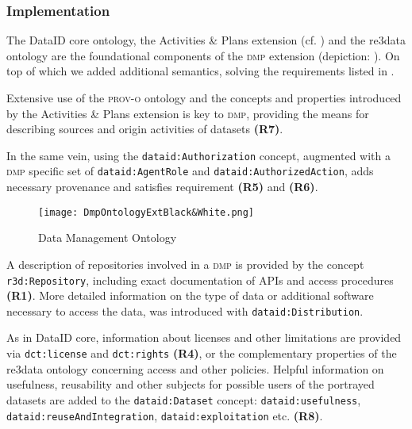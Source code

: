 \documentclass[runningheads,a4paper]{llncs}
\newcommand{\prov}{{\scshape prov-o}\xspace}
\newcommand{\dmp}{{\scshape dmp}\xspace}
\newcommand{\prop}[1]{{{\texttt{#1}}}}
\begin{document}

\subsubsection{Implementation}
\label{implDmp}
The DataID core ontology, the Activities \& Plans extension (cf. ) and the re3data ontology are the foundational components of the \dmp extension (depiction: ). On top of which we added additional semantics, solving the requirements listed in .

Extensive use of the \prov ontology and the concepts and properties introduced by the Activities \& Plans extension is key to \dmp, providing the means for describing sources and origin activities of datasets \textbf{(R7)}.

In the same vein, using the \prop{dataid:Authorization} concept, augmented with a \dmp specific set of \prop{dataid:AgentRole} and \prop{dataid:AuthorizedAction}, adds necessary provenance and satisfies requirement \textbf{(R5)} and \textbf{(R6)}.

\begin{figure}
\centering
\texttt{[image: DmpOntologyExtBlack\&White.png]}
  \caption{Data Management Ontology}
  \label{fig:dmp}
  \vspace{-1.5em}
\end{figure}

A description of repositories involved in a \dmp is provided by the concept \prop{r3d:Repository}, including exact documentation of APIs and access procedures \textbf{(R1)}. More detailed information on the type of data or additional software necessary to access the data, was introduced with \prop{dataid:Distribution}.

As in DataID core, information about licenses and other limitations are provided via \prop{dct:license} and \prop{dct:rights} \textbf{(R4)}, or the complementary properties of the re3data ontology concerning access and other policies.
Helpful information on usefulness, reusability and other subjects for possible users of the portrayed datasets are added to the \prop{dataid:Dataset} concept: \prop{dataid:usefulness}, \prop{dataid:reuseAndIntegration}, \prop{dataid:exploitation} etc. \textbf{(R8)}.
\end{document}
